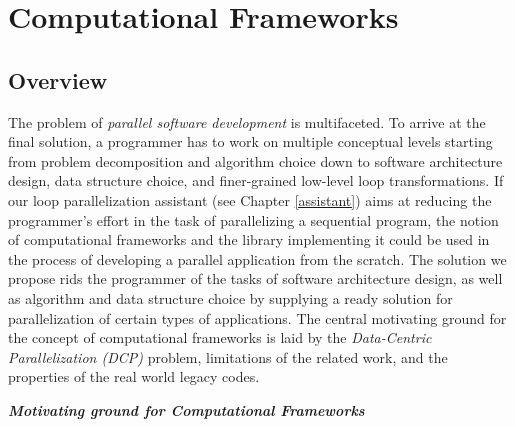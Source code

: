 \chapter{Computational Frameworks}
\label{frameworks}
\section{Overview}
\label{frameworks_overview}
\quad The problem of \textit{parallel software development} is multifaceted. To arrive at the final solution, a programmer has to work on multiple conceptual levels starting from problem decomposition and algorithm choice down to software architecture design, data structure choice, and finer-grained low-level loop transformations. If our loop parallelization assistant (see Chapter \ref{assistant}) aims at reducing the programmer's effort in the task of parallelizing a sequential program, the notion of computational frameworks and the library implementing it could be used in the process of developing a parallel application from the scratch. The solution we propose rids the programmer of the tasks of software architecture design, as well as algorithm and data structure choice by supplying a ready solution for parallelization of certain types of applications. The central motivating ground for the concept of computational frameworks is laid by the \textit{Data-Centric Parallelization (DCP)} problem, limitations of the related work, and the properties of the real world legacy codes.
\begin{center}
\textbf{\large \textit{Motivating ground for Computational Frameworks}}
\end{center}
